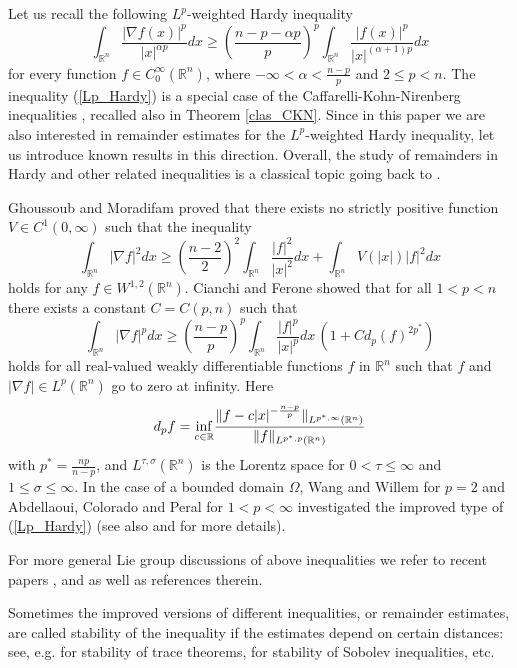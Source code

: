 \documentclass[a4paper,12pt,reqno]{amsart}
\renewcommand\eqref[1]{(\ref{#1})} %
\numberwithin{equation}{section}
\theoremstyle{plain}
\theoremstyle{definition}
\newcommand{\Rn}{\mathbb R^{n}}
\begin{document}
Let us recall the following $L^{p}$-weighted Hardy inequality
\begin{equation}\label{Lp_Hardy}
\int_{\Rn}\frac{|\nabla f(x)|^{p}}{|x|^{\alpha p}}dx\geq\left(\frac{n-p-\alpha p}{p}\right)^{p}\int_{\Rn}\frac{|f(x)|^{p}}{|x|^{(\alpha+1)p}}dx
\end{equation}
for every function $f\in C_{0}^{\infty}(\Rn)$, where $-\infty<\alpha<\frac{n-p}{p}$ and $2\leq p<n$. The inequality \eqref{Lp_Hardy} is a special case of the Caffarelli-Kohn-Nirenberg inequalities \cite{CKN84}, recalled also in Theorem \ref{clas_CKN}. Since in this paper we are also interested in remainder estimates for the $L^{p}$-weighted Hardy inequality, let us introduce known results in this direction. Overall, the study of remainders in Hardy and other related inequalities is a classical topic going back to \cite{Brez1, Brez2, BV97}.

Ghoussoub and Moradifam \cite{GM08} proved that there exists no strictly positive function $V\in C^{1}(0,\infty)$ such that the inequality
$$\int_{\Rn}|\nabla f|^{2}dx\geq\left(\frac{n-2}{2}\right)^{2}\int_{\Rn}\frac{|f|^{2}}{|x|^{2}}dx+\int_{\Rn}V(|x|)|f|^{2}dx$$
holds for any $f\in W^{1,2}(\Rn)$. Cianchi and Ferone \cite {CF08} showed that for all $1<p<n$ there exists a constant $C=C(p,n)$ such that
$$\int_{\Rn}|\nabla f|^{p}dx\geq\left(\frac{n-p}{p}\right)^{p}\int_{\Rn}\frac{|f|^{p}}{|x|^{p}}dx\,(1+Cd_{p}(f)^{2p^{*}})$$
holds for all real-valued weakly differentiable functions $f$ in $\Rn$ such that $f$ and $|\nabla f|\in L^{p}(\Rn)$ go to zero at infinity. Here
$$d_{p}f=\underset{c\in \mathbb{R}}{\rm inf}\frac{\|f-c|x|^{-\frac{n-p}{p}}\|_{L^{p^{*},\infty}(\Rn)}}{\|f\|_{L^{p^{*},p}(\Rn)}}$$ with $p^{*}=\frac{np}{n-p}$, and $L^{\tau, \sigma}(\Rn)$ is the Lorentz space for $0<\tau\leq \infty$ and $1\leq\sigma\leq\infty$.
In the case of a bounded domain $\Omega$, Wang and Willem \cite{WW03} for $p=2$ and Abdellaoui, Colorado and Peral \cite{ACP05} for $1<p<\infty$ investigated the improved type of \eqref{Lp_Hardy} (see also \cite{ST15a} and \cite{ST15b} for more details).

For more general Lie group discussions of above inequalities we refer to recent papers \cite{Ruzhansky-Suragan:Layers}, \cite{Ruzhansky-Suragan:squares} and \cite{Ruzhansky-Suragan:JDE} as well as references therein.

Sometimes the improved versions of different inequalities, or remainder estimates, are called stability of the inequality if the estimates depend on certain distances: see, e.g. \cite{BJOS16} for stability of trace theorems, \cite{CFW13} for stability of Sobolev inequalities, etc.
\end{document}
